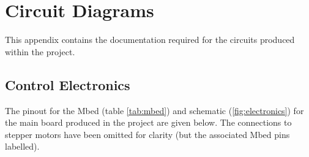 \chapter{Circuit Diagrams}
	
	This appendix contains the documentation required for the circuits produced
	within the project.
	
	\section{Control Electronics}
		\label{sec:mainboardDiagrams}
		
		The pinout for the Mbed (table \ref{tab:mbed}) and schematic
		(\ref{fig:electronics}) for the main board produced in the project are given
		below. The connections to stepper motors have been omitted for clarity (but
		the associated Mbed pins labelled).
		
